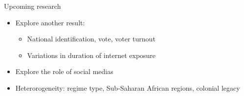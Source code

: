 \documentclass[10pt]{beamer}
\begin{document}
\begin{frame}{Upcoming research}

    \begin{itemize}
        \item Explore another result:\vspace{0.5em}
        \begin{itemize}
            \item National identification, vote, voter turnout\vspace{0.5em}
            \item Variations in duration of internet exposure\vspace{0.5em}
        \end{itemize}
        \item Explore the role of social medias\vspace{0.5em}
        \item Heterorogeneity: regime type, Sub-Saharan African regions, colonial legacy
    \end{itemize}
    
\end{frame}
\end{document}
